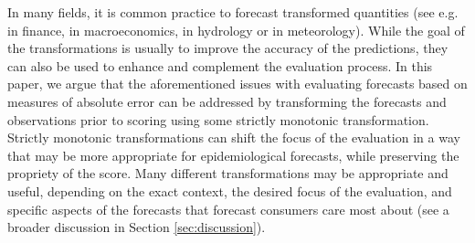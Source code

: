 \documentclass{article}
\begin{document}


In many fields, it is common practice to forecast transformed quantities (see e.g. \cite{taylorEvaluatingVolatilityInterval1999} in finance, \cite{mayrLogLevelVAR2015} in macroeconomics, \cite{loweStochasticRainfallrunoffForecasting2014} in hydrology or \cite{fuglstadDoesNonstationarySpatial2015} in meteorology). While the goal of the transformations is usually to improve the accuracy of the predictions, they can also be used to enhance and complement the evaluation process. 
In this paper, we argue that the aforementioned issues with evaluating forecasts based on measures of absolute error can be addressed by transforming the forecasts and observations prior to scoring using some strictly monotonic transformation. Strictly monotonic transformations can shift the focus of the evaluation in a way that may be more appropriate for epidemiological forecasts, while preserving the propriety of the score. Many different transformations may be appropriate and useful, depending on the exact context, the desired focus of the evaluation, and specific aspects of the forecasts that forecast consumers care most about (see a broader discussion in Section \ref{sec:discussion}). 
\end{document}
